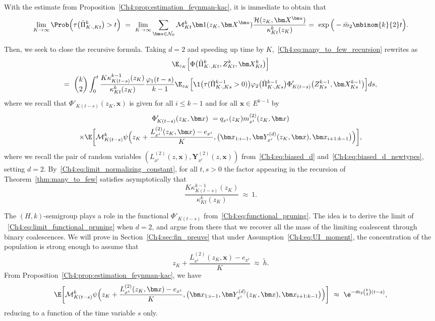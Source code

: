 \begin{refsegment}
With the estimate from Proposition~\ref{Ch4:prop:estimation_feynman-kac}, it is immediate to obtain that
\[
\lim_{K\to\infty} \Prob\Big(\tau\big(\tilde\Pi^k_{K\cdot, Kt}\big)>t\Big)\ =\ \lim_{K\to\infty}\sum_{\bm u \in \mathcal  N_0}\mathcal M^k_{Kt}\bm 1(z_K, \bm X^{\bm u})\frac{\mathcal{H}(z_K,\bm X^{\bm u})}{\kappa^k_{Kt}(z_K)} =\ \exp\Big(-\bar m_2\mbinom{k}{2}t\Big).
\]

Then, we seek to close the recursive formula.
Taking $d=2$ and speeding up time by $K$,~\eqref{Ch4:eq:many_to_few_recursion} rewrites as 
\begin{multline*}
\E_{z_K}\Big[\Phi\big(\tilde\Pi^k_{K\cdot, Kt}, Z^k_{Kt}, \bm X^k_{Kt}\big)\Big]\\ =\ \binom{k}{2} \int_0^t \frac{K\kappa^{k-1}_{K(t-s)}(z_K)}{\kappa^k_{Kt}(z_K)}\frac{\varphi_1(t-s)}{k-1} \E_{z_K}\Big[\1\big(\tau(\tilde{\Pi}^{k-1}_{K\cdot,Ks} >0)\big)\varphi_2\big(\tilde{\Pi}^{k-1}_{K\cdot,Ks}\big)\Phi'_{K(t-s)}\big( Z^{k-1}_{Ks}, \bm X^{k-1}_{Ks}\big)\Big] ds,
\end{multline*}
where we recall that $\Phi'_{K(t-s)}( z_K,\bm x)$ is given for all $i\leq k-1$ and for all $\bm x\in E^{k-1}$ by
\begin{multline}\label{Ch4:eq:limit_functional_pruning}
  \Phi'_{K(t-s)}( z_K,\bm x)\ = q_{x^i}(z_K)m^{(2)}_{x^i}(z_K,\bm x)\\
  \times \E\bigg[\mathcal{M}^k_{K(t-s)}\psi\Big(z_K + \frac{L^{(2)}_{x^i}(z_K, \bm x)-e_{x^i}}{K},\big(\bm x_{1:i-1},\bm Y^{(d)}_{x^i}(z_K,\bm x), \bm x_{i+1:k-1}\big)\Big)\bigg],
\end{multline}
where we recall the pair of random variables $(L^{(2)}_{x^i}(z, \bm x),\bm Y^{(2)}_{x^i}(z,\bm x))$ from~\eqref{Ch4:eq:biased_d} and~\eqref{Ch4:eq:biased_d_newtypes}, setting $d=2$. 
By~\eqref{Ch4:eq:limit_normalizing_constant}, for all $t,s>0$  the factor appearing in the recursion of Theorem~\ref{thm:many_to_few} satisfies  asymptotically that
\[
\frac{K\kappa^{k-1}_{K(t-s)}(z_K)}{\kappa^k_{Kt}(z_K)}\ \approx\ 1.
\] 

The $(H,k)$-semigroup plays a role in the functional $\Phi'_{K(t-s)}$ from~\eqref{Ch4:eq:functional_pruning}.
The idea is to derive the limit of
~\eqref{Ch4:eq:limit_functional_pruning} when $d=2$, and argue from there that we recover all the mass of the limiting coalescent through binary coalescences.
We will prove in Section~\ref{Ch4:sec:fin_preuve} that under Assumption~\ref{Ch4:eq:UI_moment}, the concentration of the population is strong enough to assume that
\[
z_K + \frac{L^{(2)}_{x^i}(z_K, \bm x)-e_{x^i}}{K}\ \approx\  
\tilde h.
\]
From Proposition~\ref{Ch4:prop:estimation_feynman-kac}, we have 
\[
\E\bigg[\mathcal{M}^k_{K(t-s)}\psi\Big(z_K + \frac{L^{(2)}_{x^i}(z_K, \bm x)-e_{x^i}}{K},\big(\bm x_{1:i-1},\bm Y^{(d)}_{x^i}(z_K,\bm x), \bm x_{i+1:k-1}\big)\Big)\bigg] \ \approx\ \e^{- \bar{m}_2 \binom{k}{2}(t-s)},
\]
reducing to a function of the time variable $s$ only.


\end{refsegment}
